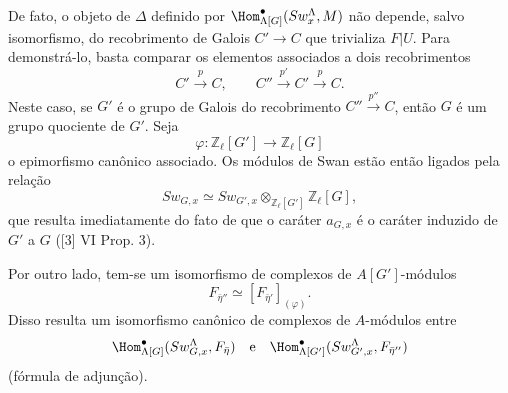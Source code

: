 De fato, o objeto de $\Delta$ definido por $\Hom^\bullet_{\Lambda[G]}(Sw_x^\Lambda,M)$ não depende, salvo isomorfismo, do recobrimento de Galois $C'\to C$ que trivializa $F|U$. Para demonstrá-lo, basta comparar os elementos associados a dois recobrimentos
\[
C'\xrightarrow{p}C,\qquad C''\xrightarrow{p'}C'\xrightarrow{p}C.
\]
Neste caso, se $G'$ é o grupo de Galois do recobrimento $C''\xrightarrow{p''}C$, então $G$ é um grupo quociente de $G'$. Seja
\[
\varphi:\mathbb Z_\ell[G']\longrightarrow \mathbb Z_\ell[G]
\]
o epimorfismo canônico associado. Os módulos de Swan estão então ligados pela relação
\[
Sw_{G,x}\simeq Sw_{G',x}\otimes_{\mathbb Z_\ell[G']}\mathbb Z_\ell[G],
\]
que resulta imediatamente do fato de que o caráter $a_{G,x}$ é o caráter induzido de $G'$ a $G$ ([3] VI Prop. 3).

Por outro lado, tem-se um isomorfismo de complexos de $A[G']$-módulos
\[
F_{\bar\eta''}\simeq [F_{\bar\eta'}]_{(\varphi)}.
\]
Disso resulta um isomorfismo canônico de complexos de $A$-módulos entre
\[
\Hom^\bullet_{\Lambda[G]}(Sw_{G,x}^\Lambda,F_{\bar\eta})
\quad\text{e}\quad
\Hom^\bullet_{\Lambda[G']}(Sw_{G',x}^\Lambda,F_{\bar\eta''})
\]
(fórmula de adjunção).
